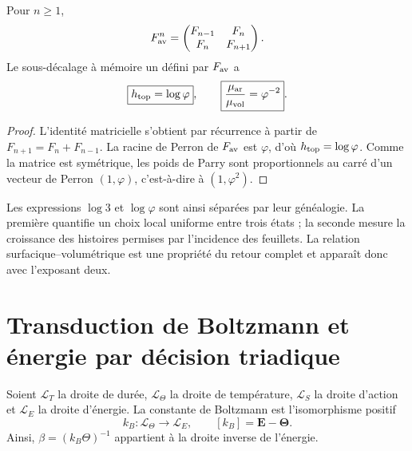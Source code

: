 \begin{theorem}
\label{thm:fibonacci-parry-anexo}
Pour \(n\geq1\),
\begin{equation}
 F_{\rm av}^{n}
 =\begin{pmatrix}F_{n-1}&F_n\\F_n&F_{n+1}\end{pmatrix}.
 \label{eq:potencias-fav-anexo}
\end{equation}
Le sous-décalage à mémoire un défini par \(F_{\rm av}\) a
\begin{equation}
 \boxed{h_{\rm top}=\log\varphi},
 \qquad
 \boxed{\frac{\mu_{\rm ar}}{\mu_{\rm vol}}=\varphi^{-2}}.
 \label{eq:entropia-parry-hojas-anexo}
\end{equation}
\end{theorem}

\begin{proof}
L’identité matricielle s’obtient par récurrence à partir de
\(F_{n+1}=F_n+F_{n-1}\). La racine de Perron de \(F_{\rm av}\) est \(\varphi\),
d’où \(h_{\rm top}=\log\varphi\). Comme la matrice est symétrique, les poids
de Parry \cite{Parry1964} sont proportionnels au carré d’un vecteur de Perron
\((1,\varphi)\), c’est-à-dire à \((1,\varphi^2)\).
\end{proof}

Les expressions \(\log3\) et \(\log\varphi\) sont ainsi séparées par leur
généalogie. La première quantifie un choix local uniforme entre trois
états ; la seconde mesure la croissance des histoires permises par
l’incidence des feuillets. La relation surfacique--volumétrique est une propriété du
retour complet et apparaît donc avec l’exposant deux.

\section{Transduction de Boltzmann et énergie par décision triadique}

Soient \(\mathcal L_T\) la droite de durée, \(\mathcal L_\Theta\) la droite de
température, \(\mathcal L_S\) la droite d'action et \(\mathcal L_E\) la droite
d'énergie. La constante de Boltzmann est l'isomorphisme positif
\begin{equation}
 \boxed{
 k_B:\mathcal L_\Theta\longrightarrow\mathcal L_E,
 \qquad [k_B]=\mathbf E-\boldsymbol\Theta.}
 \label{eq:boltzmann-transductor-anexo}
\end{equation}
Ainsi, \(\beta=(k_B\Theta)^{-1}\) appartient à la droite inverse de l'énergie.

